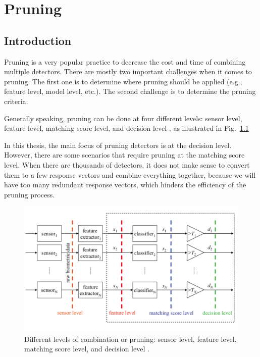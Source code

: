 \chapter{Pruning} \label{chapter3}


 \section{Introduction}
\label{sec:chap3-introduction}

Pruning is a very popular practice to decrease the cost and time of combining multiple detectors. There are mostly two important challenges when it comes to pruning. The first one is to determine where pruning should be applied (e.g., feature level, model level, etc.). The second challenge is to determine the pruning criteria.

Generally speaking, pruning can be done at four different levels: sensor level, feature level, matching score level, and decision level \cite{Tao2009}, as illustrated in Fig.~\ref{fig::level_of_pruning}

 In this thesis, the main focus of pruning detectors is at the decision level. However, there are some scenarios that require pruning at the matching score level. When there are thousands of detectors, it does not make sense to convert them to a few response vectors and combine everything together, because  we will have too many redundant response vectors, which hinders the efficiency of the pruning process.


\begin{figure}[]
\centering
\includegraphics[width=1\linewidth]{figs/level-of-pruning}
\caption{Different levels of combination or pruning: sensor level, feature level, matching score level, and decision level \cite{Tao2009}.}
\label{fig::level_of_pruning}
\end{figure}

